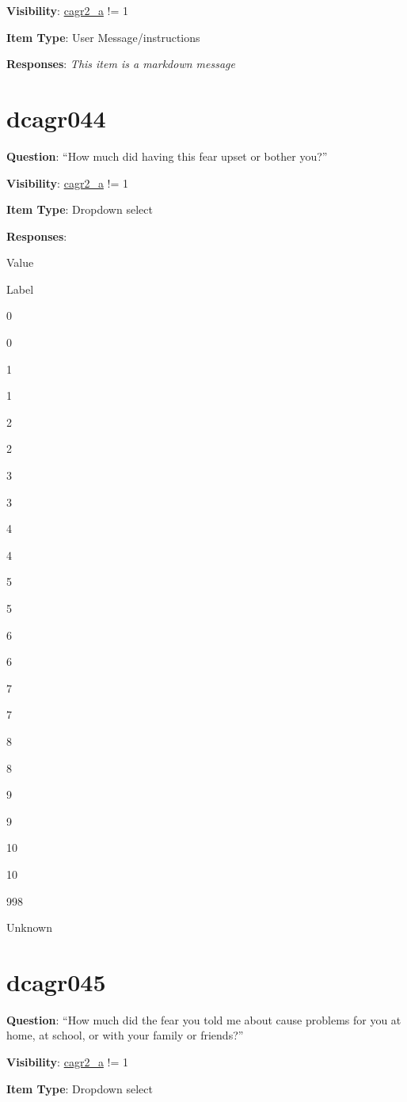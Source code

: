 \documentclass[]{book}
\begin{document}
\textbf{Visibility}: \protect\hyperlink{cagr2_a}{cagr2\_a} != 1

\textbf{Item Type}: User Message/instructions

\textbf{Responses}: \emph{This item is a markdown message}

\hypertarget{dcagr044}{%
\section{dcagr044}\label{dcagr044}}

\textbf{Question}: ``How much did having this fear upset or bother you?''

\textbf{Visibility}: \protect\hyperlink{cagr2_a}{cagr2\_a} != 1

\textbf{Item Type}: Dropdown select

\textbf{Responses}:

Value

Label

0

0

1

1

2

2

3

3

4

4

5

5

6

6

7

7

8

8

9

9

10

10

998

Unknown

\hypertarget{dcagr045}{%
\section{dcagr045}\label{dcagr045}}

\textbf{Question}: ``How much did the fear you told me about cause problems for you at home, at school, or with your family or friends?''

\textbf{Visibility}: \protect\hyperlink{cagr2_a}{cagr2\_a} != 1

\textbf{Item Type}: Dropdown select
\end{document}
